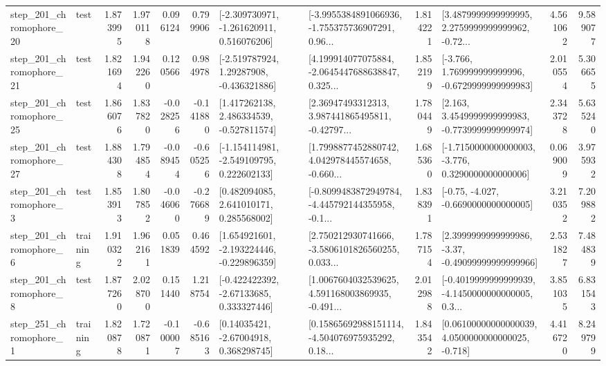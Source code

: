 \begin{tabular}{llrrrrllrlrr}
  step\_201\_chromophore\_20 &      test &      1.873995 &    1.970118 &      0.096124 &  0.799906 &   [-2.309730971, -1.261620911, 0.516076206] &  [-3.9955384891066936, -1.755375736907291, 0.96... &       1.814221 &  [3.4879999999999995, 2.2759999999999962, -0.72... &            4.561062 &          9.589077 \\
  step\_201\_chromophore\_21 &      test &      1.821694 &    1.942260 &      0.120566 &  0.984978 &    [-2.519787924, 1.29287908, -0.436321886] &  [4.199914077075884, -2.0645447688638847, 0.325... &       1.852199 &   [-3.766, 1.769999999999996, -0.6729999999999983] &            2.010554 &          5.306655 \\
  step\_201\_chromophore\_25 &      test &      1.866076 &    1.837820 &     -0.028256 & -0.141880 &    [1.417262138, 2.486334539, -0.527811574] &  [2.36947493312313, 3.987441865495811, -0.42797... &       1.780449 &   [2.163, 3.4549999999999983, -0.7739999999999974] &            2.343728 &          5.635240 \\
  step\_201\_chromophore\_27 &      test &      1.884308 &    1.794854 &     -0.089454 & -0.605256 &   [-1.154114981, -2.549109795, 0.222602133] &  [1.7998877452880742, 4.042978445574658, -0.660... &       1.685360 &  [-1.7150000000000003, -3.776, 0.3290000000000006] &            0.069009 &          3.975932 \\
   step\_201\_chromophore\_3 &      test &      1.853913 &    1.807852 &     -0.046060 & -0.276689 &     [0.482094085, 2.641010171, 0.285568002] &  [-0.8099483872949784, -4.445792144355958, -0.1... &       1.838391 &               [-0.75, -4.027, -0.6690000000000005] &            3.210352 &          7.209882 \\
   step\_201\_chromophore\_6 &  training &      1.910322 &    1.962161 &      0.051839 &  0.464592 &   [1.654921601, -2.193224446, -0.229896359] &  [2.750212930741666, -3.5806101826560255, 0.033... &       1.787154 &  [2.3999999999999986, -3.37, -0.49099999999999966] &            2.531827 &          7.484839 \\
   step\_201\_chromophore\_8 &      test &      1.877260 &    2.028700 &      0.151440 &  1.218754 &    [-0.422422392, -2.67133685, 0.333327446] &  [1.0067604032539625, 4.591168003869935, -0.491... &       2.012988 &  [-0.4019999999999939, -4.1450000000000005, 0.3... &            3.851035 &          6.831543 \\
   step\_251\_chromophore\_1 &  training &      1.820878 &    1.720871 &     -0.100007 & -0.685163 &      [0.14035421, -2.67004918, 0.368298745] &  [0.15865692988151114, -4.504076975935292, 0.18... &       1.843542 &  [0.06100000000000039, 4.0500000000000025, -0.718] &            4.416720 &          8.249799 \\

\end{tabular}
